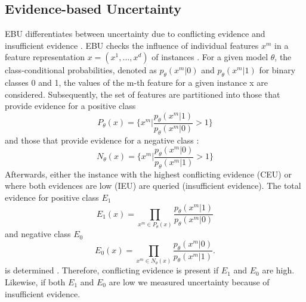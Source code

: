 \subsection{Evidence-based Uncertainty} 
\label{subsec:evidence_based_uncertainty}

\ac{EBU} differentiates between uncertainty due to conflicting evidence and insufficient evidence \cite{nguyen2021howtomeasure}.
\ac{EBU} checks the influence of individual features $x^m$ in a feature representation 
$x = (x^1,..., x^d)$ of instances \cite{nguyen2021howtomeasure}.
For a given model $\theta$, the class-conditional probabilities, denoted as $p_{\theta}(x^m |0)$ and $p_{\theta}(x^m | 1)$ for binary classes 0 and 1, the values of the m-th feature for a given instance x are considered.
Subsequently, the set of features are partitioned into those that provide evidence for a positive class
\begin{equation}
    P_{\theta}(x) = \bigg\{ x^m \bigg| \frac{p_{\theta}(x^m|1)}{p_{\theta}(x^m|0)} > 1 \bigg\} 
\end{equation}
and those that provide evidence for a negative class \cite{nguyen2021howtomeasure}:
 \begin{equation}
    N_{\theta}(x) = \bigg\{ x^m \bigg| \frac{p_{\theta}(x^m|0)}{p_{\theta}(x^m|1)} > 1 \bigg\} 
\end{equation}
Afterwards, either the instance with the highest conflicting evidence (\ac{CEU}) or where both evidences are low (\ac{IEU}) are queried (insufficient evidence).
The total evidence for positive class $E_1$ 
\begin{equation}
    E_1(x) = \prod\limits_{x^m \in P_{\theta}(x)} \frac{p_{\theta}(x^m|1)}{p_{\theta}(x^m|0)}
\end{equation}
and negative class $E_0$
\begin{equation}
    E_0(x) = \prod\limits_{x^m \in N_{\theta}(x)} \frac{p_{\theta}(x^m|0)}{p_{\theta}(x^m|1)}.
\end{equation} 
is determined \cite{nguyen2021howtomeasure}.
Therefore, conflicting evidence is present if $E_1$ and $E_0$ are high.
Likewise, if both $E_1$ and $E_0$ are low we measured uncertainty because of insufficient evidence.
